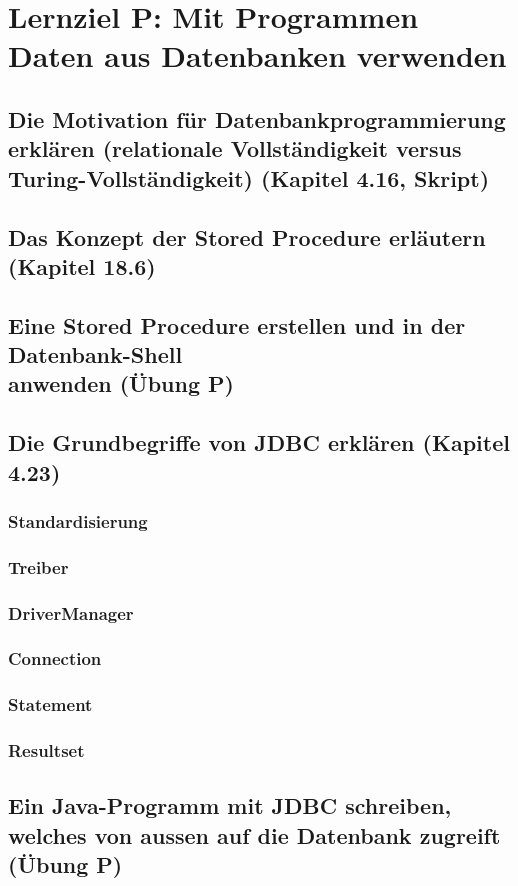 \section{Lernziel P: Mit Programmen Daten aus Datenbanken verwenden}

\subsection{Die Motivation für Datenbankprogrammierung erklären (relationale Vollständigkeit versus Turing-Vollständigkeit) (Kapitel 4.16, Skript)}

\subsection{Das Konzept der Stored Procedure erläutern (Kapitel 18.6)}

\subsection{Eine Stored Procedure erstellen und in der Datenbank-Shell \\ anwenden (Übung P)}

\subsection{Die Grundbegriffe von JDBC erklären (Kapitel 4.23)}

\subsubsection{Standardisierung}

\subsubsection{Treiber}

\subsubsection{DriverManager}

\subsubsection{Connection}

\subsubsection{Statement}

\subsubsection{Resultset}

\subsection{Ein Java-Programm mit JDBC schreiben, welches von aussen auf die Datenbank zugreift (Übung P)}
